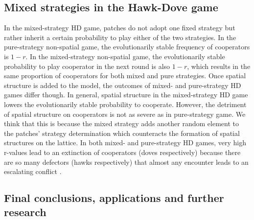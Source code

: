 \subsection{Mixed strategies in the Hawk-Dove game}

In the mixed-strategy HD game, patches do not adopt one fixed strategy but rather inherit a certain probability to play either of the two strategies. In the pure-strategy non-spatial game, the evolutionarily stable frequency of cooperators is $1-r$. In the mixed-strategy non-spatial game, the evolutionarily stable probability to play cooperator in the next round is also $1-r$, which results in the same proportion of cooperators for both mixed and pure strategies. Once spatial structure is added to the model, the outcomes of mixed- and pure-strategy HD games differ though.
In general, spatial structure in the mixed-strategy HD game lowers the evolutionarily stable probability to cooperate. However, the detriment of spatial structure on cooperators is not as severe as in pure-strategy game. We think that this is because the mixed strategy adds another random element to the patches' strategy determination which counteracts the formation of spatial structures on the lattice.
In both mixed- and pure-strategy HD games, very high r-values lead to an extinction of cooperators (doves respectively) because there are so many defectors (hawks respectively) that almost any encounter leads to an escalating conflict \citep{HauertandDoebeli2004}.


\subsection{Final conclusions, applications and further research}

